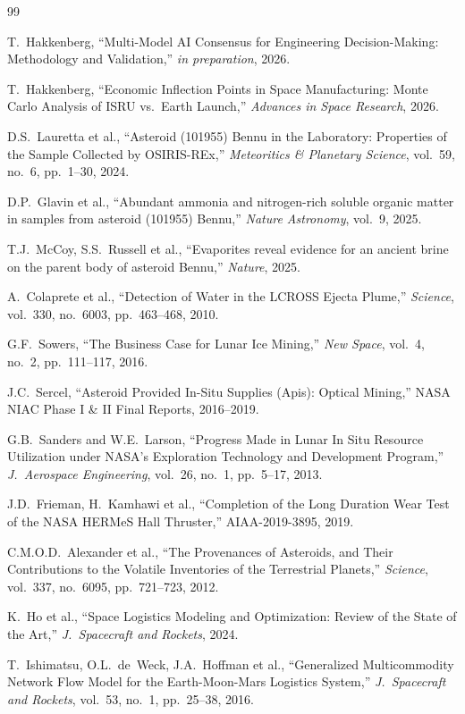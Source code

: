 \documentclass[preprint,12pt]{elsarticle}
\begin{document}
\begin{thebibliography}{99}

T.\ Hakkenberg, ``Multi-Model AI Consensus for Engineering Decision-Making: Methodology and Validation,'' \textit{in preparation}, 2026.

T.\ Hakkenberg, ``Economic Inflection Points in Space Manufacturing: Monte Carlo Analysis of ISRU vs.\ Earth Launch,'' \textit{Advances in Space Research}, 2026.

D.S.\ Lauretta et al., ``Asteroid (101955) Bennu in the Laboratory: Properties of the Sample Collected by OSIRIS-REx,'' \textit{Meteoritics \& Planetary Science}, vol.~59, no.~6, pp.~1--30, 2024.

D.P.\ Glavin et al., ``Abundant ammonia and nitrogen-rich soluble organic matter in samples from asteroid (101955) Bennu,'' \textit{Nature Astronomy}, vol.~9, 2025.

T.J.\ McCoy, S.S.\ Russell et al., ``Evaporites reveal evidence for an ancient brine on the parent body of asteroid Bennu,'' \textit{Nature}, 2025.

A.\ Colaprete et al., ``Detection of Water in the LCROSS Ejecta Plume,'' \textit{Science}, vol.~330, no.~6003, pp.~463--468, 2010.

G.F.\ Sowers, ``The Business Case for Lunar Ice Mining,'' \textit{New Space}, vol.~4, no.~2, pp.~111--117, 2016.

J.C.\ Sercel, ``Asteroid Provided In-Situ Supplies (Apis): Optical Mining,'' NASA NIAC Phase I \& II Final Reports, 2016--2019.

G.B.\ Sanders and W.E.\ Larson, ``Progress Made in Lunar In Situ Resource Utilization under NASA's Exploration Technology and Development Program,'' \textit{J.\ Aerospace Engineering}, vol.~26, no.~1, pp.~5--17, 2013.

J.D.\ Frieman, H.\ Kamhawi et al., ``Completion of the Long Duration Wear Test of the NASA HERMeS Hall Thruster,'' AIAA-2019-3895, 2019.

C.M.O.D.\ Alexander et al., ``The Provenances of Asteroids, and Their Contributions to the Volatile Inventories of the Terrestrial Planets,'' \textit{Science}, vol.~337, no.~6095, pp.~721--723, 2012.

K.\ Ho et al., ``Space Logistics Modeling and Optimization: Review of the State of the Art,'' \textit{J.\ Spacecraft and Rockets}, 2024.

T.\ Ishimatsu, O.L.\ de~Weck, J.A.\ Hoffman et al., ``Generalized Multicommodity Network Flow Model for the Earth-Moon-Mars Logistics System,'' \textit{J.\ Spacecraft and Rockets}, vol.~53, no.~1, pp.~25--38, 2016.

\end{thebibliography}
\end{document}
